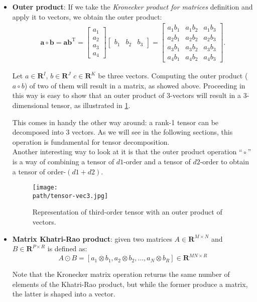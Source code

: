 \begin{itemize}
    
    \item \textbf{Outer product}: If we take the \emph{Kronecker product for matrices} definition and apply it to vectors, we obtain the outer product: \\
        
        \begin{align}
            \mathbf{a} \circ \mathbf{b} = \mathbf{a} \mathbf{b}^\mathrm{T}
            = \begin{bmatrix}a_1 \\ a_2 \\ a_3 \\ a_4\end{bmatrix}
            \begin{bmatrix}b_1 & b_2 & b_3\end{bmatrix}
            = \begin{bmatrix}a_1b_1 & a_1b_2 & a_1b_3 \\ a_2b_1 & a_2b_2 & a_2b_3 \\ a_3b_1 & a_3b_2 & a_3b_3 \\ a_4b_1 & a_4b_2 & a_4b_3\end{bmatrix}.
        \end{align}

        Let $a \in \mathbf{R}^I$, $b \in \mathbf{R}^J$  $c \in \mathbf{R}^K$ be three vectors. Computing the outer 
        product ($a  \circ  b$) of two of them will result in a matrix, as showed above. Proceeding in this way is easy to show that an outer product of 3-vectors will result in a 3-dimensional tensor, as illustrated in \ref{fig:tensor-outer-product}.
        
        This comes in handy the other way around: a rank-1 tensor can be decomposed into 3 vectors. As we will see in the following sections, this operation is fundamental for tensor decomposition.\\
        Another interesting way to look at it is that the outer product operation “◦” is a way of combining a tensor of $d1$-order and a tensor of $d2$-order to obtain a tensor of order-$(d1+d2)$.
        
         \begin{figure}[h!]
 		\centering
 		\texttt{[image: \\path/tensor-vec3.jpg]} 
 		\caption{Representation of third-order tensor with an outer product of vectors.}
 		\label{fig:tensor-outer-product}
		\end{figure}

    \item \textbf{Matrix Khatri-Rao product}: given two matrices $A \in \mathbf{R}^{M \times N}$ and $B \in            \mathbf{R}^{P \times R}$ is defined as: 
        \begin{equation}
            A \odot B = [a_1 \otimes b_1, a_2 \otimes b_2, \ldots, a_N \otimes b_R] \in \mathbf{R}^{MN \times R}
        \end{equation}
        
        Note that the Kronecker matrix operation returns the same number of elements of the Khatri-Rao product, but while the former produce a matrix, the latter is shaped into a vector.   
\end{itemize}

